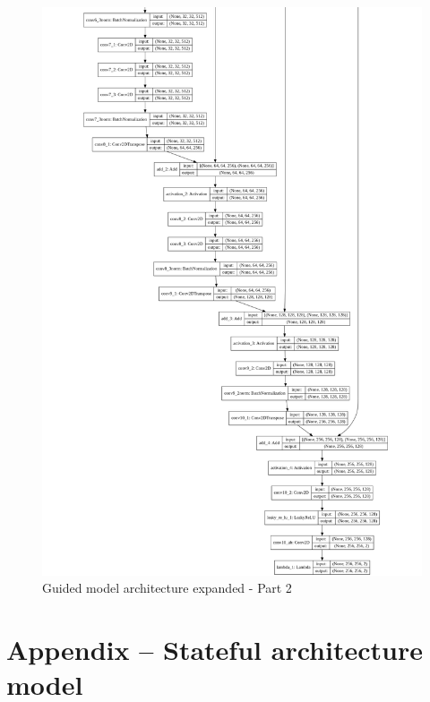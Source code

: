 \documentclass[12pt,openright,oneside,a4paper,english]{abntex2}
\begin{document}
\begin{otherlanguage}{english}
    \begin{figure}[!htb]
    \centering
    \includegraphics[height=\textheight]{model_plot/Guided2}
    \caption{Guided model architecture expanded - Part 2}
    \label{guided_plot_2}
    \end{figure}

    \chapter{Appendix -- Stateful architecture model}


\end{otherlanguage}
\end{document}
